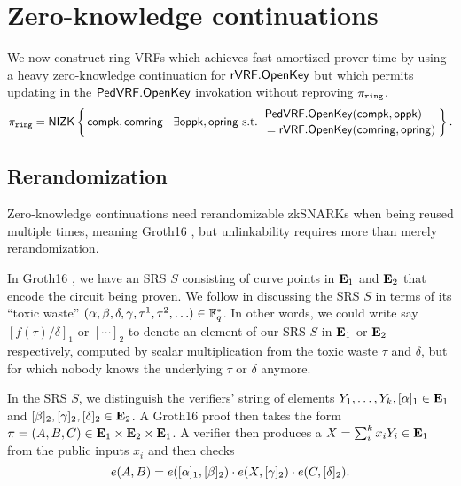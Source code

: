 
\section{Zero-knowledge continuations}
\label{sec:rvrf_cont}

\newcommand\rrSNARK{\primalgo{Groth16}\xspace}
\newcommand\pifast{\ensuremath{\pi_{\mathtt{fast}}}\xspace}
\newcommand\pifastdot{\ensuremath{\dot{\pi}_{\mathtt{fast}}}\xspace}
\newcommand\pisafe{\ensuremath{\pi_{\mathtt{safe}}}\xspace}
\newcommand\pisafedot{\ensuremath{\dot{\pi}_{\mathtt{safe}}}\xspace}

We now construct ring VRFs which achieves fast amortized prover time
by using a heavy zero-knowledge continuation for ${\mathsf{rVRF}}.{\mathsf{OpenKey}}$ but
which permits updating \openpk in the ${\mathsf{PedVRF}}.{\mathsf{OpenKey}}$ invokation
without reproving $\pi_{\mathtt{ring}}$.
$$ \piring = \NIZK \Setst{ \compk, \comring }{
 \exists \openpk,\openring \textrm{\ s.t.\ } 
 \genfrac{}{}{0pt}{}{\PedVRF.\OpenKey(\compk,\openpk) \quad}{\,\, = \rVRF.\OpenKey(\comring,\openring)}
} \mathperiod $$

\subsection{Rerandomization}

Zero-knowledge continuations need rerandomizable zkSNARKs
when being reused multiple times, meaning Groth16 \cite{groth16},
but unlinkability requires more than merely rerandomization.

In Groth16 \cite{groth16}, we have an SRS $S$ consisting of curve
points in ${\mathbf{E}}_1$ and ${\mathbf{E}}_2$ that encode the circuit being proven.
We follow \cite{groth16} in discussing the SRS $S$ in terms of
its ``toxic waste''
 $(\alpha,\beta,\delta,\gamma,\tau^1,\tau^2,\ldots) \in \mathbb{F}_q^*$.
In other words, we could write say $[ f(\tau)/\delta ]_1$ or $[\cdots]_2$
to denote an element of our SRS $S$ in ${\mathbf{E}}_1$ or ${\mathbf{E}}_2$ respectively,
computed by scalar multiplication from the toxic waste $\tau$ and $\delta$,
 but for which nobody knows the underlying $\tau$ or $\delta$ anymore.

In the SRS $S$, we distinguish the verifiers' string of elements
 $Y_1,\ldots,Y_k, [\alpha]_1 \in {\mathbf{E}}_1$ and
 $[\beta]_2, [\gamma]_2, [\delta]_2 \in {\mathbf{E}}_2$.
A Groth16 \cite{groth16} proof then takes the form 
 $\pi = (A,B,C) \in {\mathbf{E}}_1 \times {\mathbf{E}}_2 \times {\mathbf{E}}_1$.
A verifier then produces a $X = \sum_i^k x_i Y_i \in {\mathbf{E}}_1$ from
 the public inputs $x_i$ and then checks 
$$ e(A,B) = e([\alpha]_1, [\beta]_2) \cdot
 e(X, [\gamma]_2) \cdot e(C, [\delta]_2) . $$

